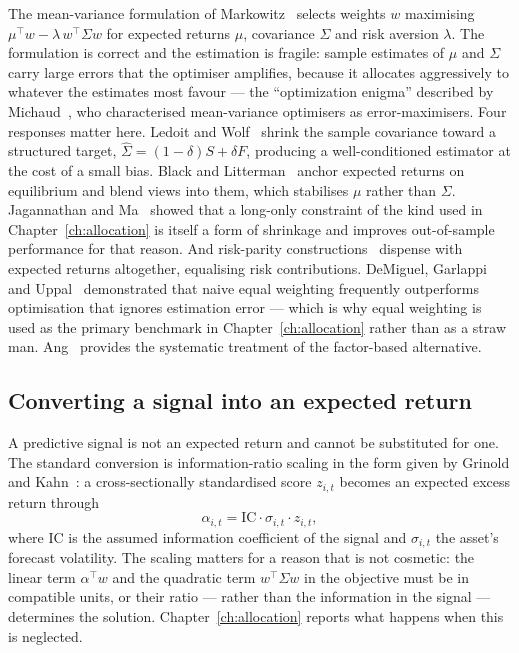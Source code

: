 The mean-variance formulation of Markowitz~\cite{markowitz1952} selects weights $w$ maximising
$\mu^{\!\top} w - \lambda\, w^{\!\top}\Sigma w$ for expected returns $\mu$, covariance $\Sigma$
and risk aversion $\lambda$. The formulation is correct and the estimation is fragile: sample
estimates of $\mu$ and $\Sigma$ carry large errors that the optimiser amplifies, because it
allocates aggressively to whatever the estimates most favour --- the ``optimization enigma''
described by Michaud~\cite{michaud1989}, who characterised mean-variance optimisers as
error-maximisers. Four responses matter here. Ledoit and Wolf~\cite{ledoit2004} shrink the sample
covariance toward a structured target, $\hat{\Sigma} = (1-\delta)S + \delta F$, producing a
well-conditioned estimator at the cost of a small bias. Black and
Litterman~\cite{blacklitterman1992} anchor expected returns on equilibrium and blend views into
them, which stabilises $\mu$ rather than $\Sigma$. Jagannathan and Ma~\cite{jagannathan2003}
showed that a long-only constraint of the kind used in Chapter~\ref{ch:allocation} is itself a
form of shrinkage and improves out-of-sample performance for that reason. And risk-parity
constructions~\cite{maillard2010} dispense with expected returns altogether, equalising risk
contributions. DeMiguel, Garlappi and Uppal~\cite{demiguel2009} demonstrated that naive equal
weighting frequently outperforms optimisation that ignores estimation error --- which is why
equal weighting is used as the primary benchmark in Chapter~\ref{ch:allocation} rather than as a
straw man. Ang~\cite{ang2014} provides the systematic treatment of the factor-based alternative.

\subsection{Converting a signal into an expected return}

A predictive signal is not an expected return and cannot be substituted for one. The standard
conversion is information-ratio scaling in the form given by Grinold and
Kahn~\cite{grinold2000}: a cross-sectionally standardised score $z_{i,t}$ becomes an expected
excess return through
\begin{equation}
\alpha_{i,t} = \mathrm{IC} \cdot \sigma_{i,t} \cdot z_{i,t},
\label{eq:grinold}
\end{equation}
where $\mathrm{IC}$ is the assumed information coefficient of the signal and $\sigma_{i,t}$ the
asset's forecast volatility. The scaling matters for a reason that is not cosmetic: the linear
term $\alpha^{\!\top}w$ and the quadratic term $w^{\!\top}\Sigma w$ in the objective must be in
compatible units, or their ratio --- rather than the information in the signal --- determines the
solution. Chapter~\ref{ch:allocation} reports what happens when this is neglected.

